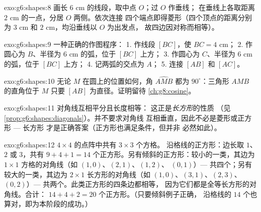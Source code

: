 \begin{solution}{exo:g6:shapes:8}
画长 $6$ cm 的线段，取中点 $O$；过 $O$ 作垂线；
在垂线上各取距离 $2$ cm 的一点，分居 $O$ 两侧。依次连接
四个端点即得菱形（四个顶点的距离分别为
$3$ cm 和 $2$ cm，均沿垂线以 $O$ 为出发点，
故四边因对称而相等）。
\end{solution}

\begin{solution}{exo:g6:shapes:9}
一种正确的作图程序：
1. 作线段 $[BC]$，使 $BC = 4$ cm；
2. 作圆心为 $B$、半径为 $6$ cm 的弧，位于 $[BC]$ 上方；
3. 作圆心为 $C$、半径为 $6$ cm 的弧，位于 $[BC]$ 上方；
4. 记两弧的交点为 $A$；
5. 连接 $[AB]$ 和 $[AC]$。
\end{solution}

\begin{solution}{exo:g6:shapes:10}
无论 $M$ 在圆上的位置如何，角 $\widehat{AMB}$
都为 $90^\circ$：三角形 $AMB$ 的直角位于 $M$
只要 $[AB]$ 为直径。证明留待
\cref{ch:g8:cosine}。
\end{solution}

\begin{solution}{exo:g6:shapes:11}
对角线互相平分且长度相等：
这正是\emph{长方形}的性质
（见\cref{prop:g6:shapes:diagonals}）。并不要求对角线
互相垂直，因此不必是菱形或正方形 --- 长方形
才是正确答案（正方形也满足条件，但并非
必然如此）。
\end{solution}

\begin{solution}{exo:g6:shapes:12}
$4 \times 4$ 的点阵中共有 $3 \times 3$ 个方格。
沿格线的正方形：边长取 $1$、$2$ 或 $3$，共有 $9 + 4 + 1 = 14$
个正方形。另有倾斜的正方形：较小的一类，其边为
$1 \times 1$ 方格的对角线（如 $(1,0)$、$(2,1)$、$(1,2)$、
$(0,1)$）--- 共四个；另有较大的一类，其边为
$2 \times 1$ 长方形的对角线（如 $(1,0)$、$(3,1)$、$(2,3)$、
$(0,2)$）--- 共两个。此类正方形的四条边都相等，
因为它们都是全等长方形的对角线。合计：
$14 + 4 + 2 = 20$ 个正方形。（只要倾斜例子正确，
沿格线的 $14$ 个也算对，即为本阶段的成功。）
\end{solution}

